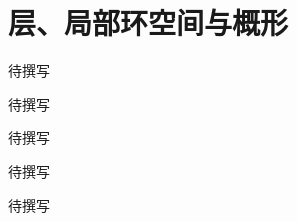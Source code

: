 
% 
% 

\chapter{层、局部环空间与概形}
\label{g5:ch:10}

\begin{chapterabstract}
待撰写
\end{chapterabstract}

\begin{learninggoals}
待撰写
\end{learninggoals}

待撰写






\begin{chaptersummary}
待撰写
\end{chaptersummary}

\BookExercises
待撰写
